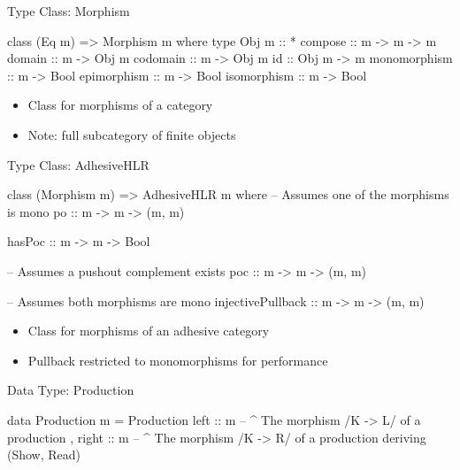 \documentclass[xcolor=dvipsnames,pdf,11pt,handout]{beamer}
\newcommand{\bi}{\begin{itemize}}
\newcommand{\ei}{\end{itemize}}
\newcommand{\tm}{\item}
\begin{document}
\begin{frame}[fragile]{Type Class: Morphism}{}

\color{blue}
\begin{haskell}
class (Eq m) => Morphism m where
    type Obj m :: *
    compose  :: m -> m -> m
    domain   :: m -> Obj m
    codomain :: m -> Obj m
    id       :: Obj m -> m
    monomorphism :: m -> Bool
    epimorphism :: m -> Bool
    isomorphism :: m -> Bool
\end{haskell}
\color{black}

\bi
\tm Class for morphisms of a category
\tm Note: full subcategory of finite objects
\ei

\end{frame}

\begin{frame}[fragile]{Type Class: AdhesiveHLR}{}

\color{blue}
\begin{haskell}
class (Morphism m) => AdhesiveHLR m where
  -- Assumes one of the morphisms is mono
  po :: m -> m -> (m, m)
  
  hasPoc :: m -> m -> Bool
  
  -- Assumes a pushout complement exists
  poc :: m -> m -> (m, m)
  
  -- Assumes both morphisms are mono
  injectivePullback :: m -> m -> (m, m)
\end{haskell}
\color{black}

\bi
\tm Class for morphisms of an adhesive category
\tm Pullback restricted to monomorphisms for performance
\ei

\end{frame}

\begin{frame}[fragile]{Data Type: Production}{}

\color{blue}
\begin{haskell}
data Production m = Production
  { left :: m   -- ^ The morphism /K -> L/ of a production
  , right :: m  -- ^ The morphism /K -> R/ of a production
  }
  deriving (Show, Read)
\end{haskell}
\color{black}

\vspace{1cm}

\centerline{
}

\end{frame}
\end{document}
